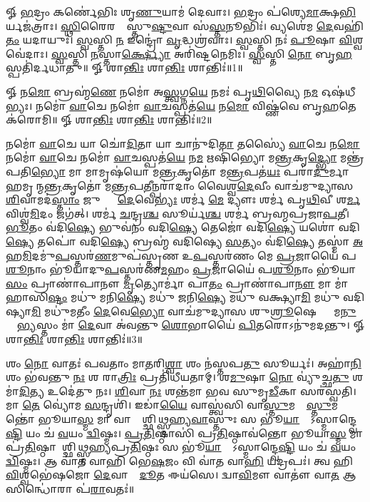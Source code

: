 


𑍐 \ul{𑌭}𑌦𑍍𑌰𑌂 𑌕𑌰𑍍𑌣𑍇॑𑌭𑌿𑌃 𑌶𑍃\ul{𑌣𑍁}𑌯𑌾𑌮॑ 𑌦𑍇𑌵𑌾𑌃। \ul{𑌭}𑌦𑍍𑌰𑌂 𑌪॑𑌶𑍍𑌯𑍇\ul{𑌮𑌾}𑌕𑍍𑌷\ul{𑌭𑌿}𑌰𑍍𑌯𑌜॑𑌤𑍍𑌰𑌾𑌃। 
\ul{𑌸𑍍𑌥𑌿}𑌰𑍈𑌰𑌙𑍍𑌗𑍈᳚𑌸𑍍𑌤𑍁\ul{𑌷𑍍𑌟𑍁}𑌵𑌾 𑌸॑\ul{𑌸𑍍𑌤}𑌨𑍂𑌭𑌿𑌃॑। 𑌵𑍍𑌯𑌶𑍇॑𑌮 \ul{𑌦𑍇}𑌵𑌹𑌿॑\ul{𑌤𑌂} 𑌯𑌦𑌾𑌯𑍁𑌃॑। 
\ul{𑌸𑍍𑌵}𑌸𑍍𑌤𑌿 \ul{𑌨} 𑌇𑌨𑍍𑌦𑍍𑌰𑍋॑ \ul{𑌵𑍃}𑌦𑍍𑌧𑌶𑍍𑌰॑𑌵𑌾𑌃। \ul{𑌸𑍍𑌵}𑌸𑍍𑌤𑌿 𑌨𑌃॑ \ul{𑌪𑍂}𑌷𑌾 \ul{𑌵𑌿}𑌶𑍍𑌵𑌵𑍇॑𑌦𑌾𑌃। 
\ul{𑌸𑍍𑌵}𑌸𑍍𑌤𑌿 \ul{𑌨}𑌸𑍍𑌤𑌾\ul{𑌰𑍍𑌕𑍍𑌷𑍍𑌯𑍋} 𑌅𑌰𑌿॑𑌷𑍍𑌟𑌨𑍇𑌮𑌿𑌃। \ul{𑌸𑍍𑌵}𑌸𑍍𑌤𑌿 \ul{𑌨𑍋} 𑌬𑍃\ul{𑌹}𑌸𑍍𑌪𑌤𑌿॑𑌰𑍍𑌦𑌧𑌾𑌤𑍁॥
𑍐 𑌶𑌾\ul{𑌨𑍍𑌤𑌿𑌃} 𑌶𑌾\ul{𑌨𑍍𑌤𑌿𑌃} 𑌶𑌾𑌨𑍍𑌤𑌿𑌃॑॥1॥


𑍐 𑌨\ul{𑌮𑍋} 𑌬𑍍𑌰𑌹𑍍𑌮॑\ul{𑌣𑍇} 𑌨𑌮𑍋॑ 𑌅\ul{𑌸𑍍𑌤𑍍𑌵}𑌗𑍍𑌨\ul{𑌯𑍇} 𑌨𑌮𑌃॑ 𑌪𑍃\ul{𑌥𑌿}𑌵𑍍𑌯𑍈 𑌨\ul{𑌮} 𑌓𑌷॑𑌧𑍀𑌭𑍍𑌯𑌃। 𑌨𑌮𑍋॑ \ul{𑌵𑌾}𑌚𑍇 𑌨𑌮𑍋॑ \ul{𑌵𑌾}𑌚𑌸𑍍𑌪𑌤॑\ul{𑌯𑍇} 𑌨\ul{𑌮𑍋} 𑌵𑌿𑌷𑍍𑌣॑𑌵𑍇 𑌬𑍃\ul{𑌹}𑌤𑍇 𑌕॑𑌰𑍋𑌮𑌿॥
𑍐 𑌶𑌾\ul{𑌨𑍍𑌤𑌿𑌃} 𑌶𑌾\ul{𑌨𑍍𑌤𑌿𑌃} 𑌶𑌾𑌨𑍍𑌤𑌿𑌃॑॥2॥


𑌨𑌮𑍋॑ \ul{𑌵𑌾}𑌚𑍇 𑌯𑌾 𑌚𑍋॑\ul{𑌦𑌿}𑌤𑌾 𑌯𑌾 𑌚𑌾𑌨𑍁॑𑌦𑌿\ul{𑌤𑌾} 𑌤𑌸𑍍𑌯𑍈॑ \ul{𑌵𑌾}𑌚𑍇 𑌨\ul{𑌮𑍋} 𑌨𑌮𑍋॑ \ul{𑌵𑌾}𑌚𑍇 𑌨𑌮𑍋॑ \ul{𑌵𑌾}𑌚𑌸𑍍𑌪𑌤॑\ul{𑌯𑍇} 𑌨\ul{𑌮} 𑌋𑌷𑌿॑𑌭𑍍𑌯𑍋 𑌮\ul{𑌨𑍍𑌤𑍍𑌰}𑌕𑍃\ul{𑌦𑍍𑌭𑍍𑌯𑍋} 𑌮𑌨𑍍𑌤𑍍𑌰॑𑌪𑌤𑌿\ul{𑌭𑍍𑌯𑍋} 𑌮𑌾 𑌮𑌾𑌮𑍃𑌷॑𑌯𑍋 𑌮\ul{𑌨𑍍𑌤𑍍𑌰}𑌕𑍃𑌤𑍋॑ 𑌮\ul{𑌨𑍍𑌤𑍍𑌰}𑌪𑌤॑\ul{𑌯𑌃} 𑌪𑌰𑌾॑\ul{𑌦𑍁}𑌰𑍍𑌮𑌾𑌹𑌮𑍃𑌷𑍀᳚𑌨𑍍𑌮\ul{𑌨𑍍𑌤𑍍𑌰}𑌕𑍃𑌤𑍋॑ 𑌮\ul{𑌨𑍍𑌤𑍍𑌰}𑌪\ul{𑌤𑍀}𑌨𑍍𑌪𑌰𑌾॑𑌦𑌾𑌂 𑌵𑍈𑌶𑍍𑌵\ul{𑌦𑍇}𑌵𑍀𑌂 𑌵𑌾𑌚॑𑌮𑍁𑌦𑍍𑌯𑌾𑌸 \ul{𑌶𑌿}𑌵𑌾𑌮𑌦॑\ul{𑌸𑍍𑌤𑌾𑌂} 𑌜𑍁𑌷𑍍𑌟𑌾𑌂᳚ \ul{𑌦𑍇}𑌵𑍇\ul{𑌭𑍍𑌯𑌃} 𑌶𑌰𑍍𑌮॑ \ul{𑌮𑍇} 𑌦𑍍𑌯𑍗𑌃  𑌶𑌰𑍍𑌮॑ 𑌪𑍃\ul{𑌥𑌿}𑌵𑍀 𑌶\ul{𑌰𑍍𑌮} 𑌵𑌿𑌶𑍍𑌵॑\ul{𑌮𑌿}𑌦𑌂 𑌜𑌗॑𑌤𑍍। 𑌶𑌰𑍍𑌮॑ \ul{𑌚}𑌨𑍍𑌦𑍍𑌰\ul{𑌶𑍍𑌚} 𑌸𑍂𑌰𑍍𑌯॑\ul{𑌶𑍍𑌚} 𑌶𑌰𑍍𑌮॑ 𑌬𑍍𑌰𑌹𑍍𑌮𑌪𑍍𑌰𑌜𑌾\ul{𑌪}𑌤𑍀। \ul{𑌭𑍂}𑌤𑌂 𑌵॑𑌦𑌿\ul{𑌷𑍍𑌯𑍇} 𑌭𑍁𑌵॑𑌨𑌂 𑌵𑌦𑌿\ul{𑌷𑍍𑌯𑍇} 𑌤𑍇𑌜𑍋॑ 𑌵𑌦𑌿\ul{𑌷𑍍𑌯𑍇} 𑌯𑌶𑍋॑ 𑌵𑌦𑌿\ul{𑌷𑍍𑌯𑍇} 𑌤𑌪𑍋॑ 𑌵𑌦𑌿\ul{𑌷𑍍𑌯𑍇} 𑌬𑍍𑌰𑌹𑍍𑌮॑ 𑌵𑌦𑌿𑌷𑍍𑌯𑍇 \ul{𑌸}𑌤𑍍𑌯𑌂 𑌵॑𑌦𑌿\ul{𑌷𑍍𑌯𑍇} 𑌤𑌸𑍍𑌮𑌾॑ \ul{𑌅}𑌹\ul{𑌮𑌿}𑌦𑌮𑍁॑\ul{𑌪}𑌸𑍍𑌤𑌰॑\ul{𑌣}𑌮𑍁𑌪॑𑌸𑍍𑌤𑍃𑌣 𑌉\ul{𑌪}𑌸𑍍𑌤𑌰॑𑌣𑌂 𑌮𑍇 \ul{𑌪𑍍𑌰}𑌜𑌾𑌯𑍈॑ 𑌪\ul{𑌶𑍂}𑌨𑌾𑌂 𑌭𑍂॑𑌯𑌾𑌦𑍁\ul{𑌪}𑌸𑍍𑌤𑌰॑𑌣\ul{𑌮}𑌹𑌂 \ul{𑌪𑍍𑌰}𑌜𑌾𑌯𑍈॑ 𑌪\ul{𑌶𑍂}𑌨𑌾𑌂 𑌭𑍂॑𑌯𑌾\ul{𑌸𑌂} 𑌪𑍍𑌰𑌾𑌣𑌾॑𑌪𑌾𑌨𑍗 \ul{𑌮𑍃}𑌤𑍍𑌯𑍋𑌰𑍍𑌮𑌾॑ 𑌪𑌾\ul{𑌤𑌂} 𑌪𑍍𑌰𑌾𑌣𑌾॑𑌪𑌾\ul{𑌨𑍗} 𑌮𑌾 𑌮𑌾॑ 𑌹𑌾𑌸𑌿\ul{𑌷𑍍𑌟𑌂} 𑌮𑌧𑍁॑ 𑌮𑌨𑌿\ul{𑌷𑍍𑌯𑍇} 𑌮𑌧𑍁॑ 𑌜𑌨𑌿\ul{𑌷𑍍𑌯𑍇} 𑌮𑌧𑍁॑ 𑌵𑌕𑍍𑌷𑍍𑌯𑌾\ul{𑌮𑌿} 𑌮𑌧𑍁॑ 𑌵𑌦𑌿𑌷𑍍𑌯𑌾\ul{𑌮𑌿} 𑌮𑌧𑍁॑𑌮𑌤𑍀𑌂 \ul{𑌦𑍇}𑌵𑍇\ul{𑌭𑍍𑌯𑍋} 𑌵𑌾𑌚॑𑌮𑍁𑌦𑍍𑌯𑌾𑌸 𑌶𑍁\ul{𑌶𑍍𑌰𑍂}𑌷𑍇𑌣𑍍𑌯𑌾𑌂᳚ 𑌮\ul{𑌨𑍁}𑌷𑍍𑌯𑍇᳚\ul{𑌭𑍍𑌯}𑌸𑍍𑌤𑌂 𑌮𑌾॑ \ul{𑌦𑍇}𑌵𑌾 𑌅॑𑌵𑌨𑍍𑌤𑍁 \ul{𑌶𑍋}𑌭𑌾𑌯𑍈॑ \ul{𑌪𑌿}𑌤𑌰𑍋𑌽𑌨𑍁॑𑌮𑌦𑌨𑍍𑌤𑍁। 𑍐 𑌶𑌾\ul{𑌨𑍍𑌤𑌿𑌃} 𑌶𑌾\ul{𑌨𑍍𑌤𑌿𑌃} 𑌶𑌾𑌨𑍍𑌤𑌿𑌃॑॥3॥

𑌶𑌂 \ul{𑌨𑍋} 𑌵𑌾𑌤𑌃॑ 𑌪𑌵𑌤𑌾𑌂 𑌮𑌾\ul{𑌤}𑌰𑌿\ul{𑌶𑍍𑌵𑌾} 𑌶𑌂 𑌨॑𑌸𑍍𑌤𑌪\ul{𑌤𑍁} 𑌸𑍂𑌰𑍍𑌯𑌃॑। 𑌅𑌹𑌾॑\ul{𑌨𑌿}𑌶𑌂 𑌭॑𑌵𑌨𑍍𑌤𑍁 \ul{𑌨𑌃} 𑌶 𑌰𑌾\ul{𑌤𑍍𑌰𑌿𑌃} 𑌪𑍍𑌰𑌤𑌿॑𑌧𑍀𑌯𑌤𑌾𑌮𑍍। 𑌶\ul{𑌮𑍁}𑌷𑌾 \ul{𑌨𑍋} 𑌵𑍍𑌯𑍁॑𑌚𑍍𑌛\ul{𑌤𑍁} 𑌶𑌮𑌾॑\ul{𑌦𑌿}𑌤𑍍𑌯 𑌉𑌦𑍇॑𑌤𑍁 𑌨𑌃। \ul{𑌶𑌿}𑌵𑌾 \ul{𑌨𑌃} 𑌶𑌨𑍍𑌤॑𑌮𑌾 𑌭𑌵 𑌸𑍁𑌮𑍃\ul{𑌡𑍀}𑌕𑌾 𑌸𑌰॑𑌸𑍍𑌵𑌤𑌿। 𑌮𑌾 \ul{𑌤𑍇} 𑌵𑍍𑌯𑍋॑𑌮 \ul{𑌸}𑌨𑍍𑌦𑍃𑌶𑌿॑। 𑌇𑌡𑌾॑\ul{𑌯𑍈} 𑌵𑌾𑌸𑍍𑌤𑍍𑌵॑𑌸𑌿 𑌵𑌾\ul{𑌸𑍍𑌤𑍁}𑌮𑌦𑍍𑌵𑌾᳚\ul{𑌸𑍍𑌤𑍁}𑌮𑌨𑍍𑌤𑍋॑ 𑌭𑍂𑌯𑌾\ul{𑌸𑍍𑌮} 𑌮𑌾 𑌵𑌾𑌸𑍍𑌤𑍋᳚𑌶𑍍𑌛𑌿𑌥𑍍𑌸𑍍𑌮𑌹𑍍𑌯\ul{𑌵𑌾}𑌸𑍍𑌤𑍁𑌃 𑌸 𑌭𑍂॑\ul{𑌯𑌾}𑌦𑍍𑌯𑍋᳚𑌽𑌸𑍍𑌮𑌾𑌨𑍍𑌦𑍍𑌵𑍇\ul{𑌷𑍍𑌟𑌿} 𑌯𑌂 𑌚॑ \ul{𑌵}𑌯𑌂 \ul{𑌦𑍍𑌵𑌿}𑌷𑍍𑌮𑌃। \ul{𑌪𑍍𑌰}\ul{𑌤𑌿}𑌷𑍍𑌠𑌾𑌸𑌿॑ 𑌪𑍍𑌰\ul{𑌤𑌿}𑌷𑍍𑌠𑌾𑌵॑𑌨𑍍𑌤𑍋 𑌭𑍂𑌯𑌾\ul{𑌸𑍍𑌮} 𑌮𑌾 𑌪𑍍𑌰॑\ul{𑌤𑌿}𑌷𑍍𑌠𑌾𑌯𑌾᳚𑌶𑍍𑌛𑌿𑌥𑍍𑌸𑍍𑌮𑌹𑍍𑌯𑌪𑍍𑌰\ul{𑌤𑌿}𑌷𑍍𑌠𑌃 𑌸 𑌭𑍂॑\ul{𑌯𑌾}𑌦𑍍𑌯𑍋᳚𑌽𑌸𑍍𑌮𑌾𑌨𑍍𑌦𑍍𑌵𑍇\ul{𑌷𑍍𑌟𑌿} 𑌯𑌂 𑌚॑ \ul{𑌵}𑌯𑌂 \ul{𑌦𑍍𑌵𑌿}𑌷𑍍𑌮𑌃। 𑌆 𑌵𑌾॑𑌤 𑌵𑌾𑌹𑌿 𑌭𑍇\ul{𑌷}𑌜𑌂 𑌵𑌿 𑌵𑌾॑𑌤 𑌵𑌾\ul{𑌹𑌿} 𑌯𑌦𑍍𑌰𑌪𑌃॑। 𑌤𑍍𑌵 𑌹𑌿 \ul{𑌵𑌿}𑌶𑍍𑌵𑌭𑍇॑𑌷𑌜𑍋 \ul{𑌦𑍇}𑌵𑌾𑌨𑌾𑌂᳚ \ul{𑌦𑍂}𑌤 𑌈𑌯॑𑌸𑍇। 𑌦𑍍𑌵𑌾\ul{𑌵𑌿}𑌮𑍗 𑌵𑌾𑌤𑍗॑ 𑌵𑌾\ul{𑌤} 𑌆 𑌸𑌿𑌨𑍍𑌧𑍋॑𑌰𑌾 𑌪॑\ul{𑌰𑌾}𑌵𑌤𑌃॑॥

